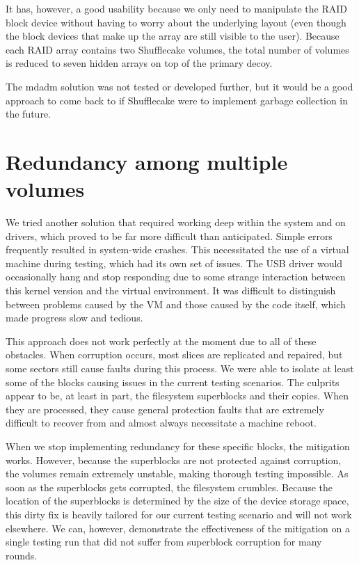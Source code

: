 \documentclass[a4paper,11pt,oneside]{report}
\begin{document}
It has, however, a good usability because we only need to manipulate the RAID block device without having to worry about the underlying layout (even though the block devices that make up the array are still visible to the user). Because each RAID array contains two Shufflecake volumes, the total number of volumes is reduced to seven hidden arrays on top of the primary decoy.

The mdadm solution was not tested or developed further, but it would be a good approach to come back to if Shufflecake were to implement garbage collection in the future.

\section{Redundancy among multiple volumes}

We tried another solution that required working deep within the system and on drivers, which proved to be far more difficult than anticipated. Simple errors frequently resulted in system-wide crashes. This necessitated the use of a virtual machine during testing, which had its own set of issues. The USB driver would occasionally hang and stop responding due to some strange interaction between this kernel version and the virtual environment. It was difficult to distinguish between problems caused by the VM and those caused by the code itself, which made progress slow and tedious.

This approach does not work perfectly at the moment due to all of these obstacles. When corruption occurs, most slices are replicated and repaired, but some sectors still cause faults during this process. We were able to isolate at least some of the blocks causing issues in the current testing scenarios. The culprits appear to be, at least in part, the filesystem superblocks and their copies. When they are processed, they cause general protection faults that are extremely difficult to recover from and almost always necessitate a machine reboot.

When we stop implementing redundancy for these specific blocks, the mitigation works. However, because the superblocks are not protected against corruption, the volumes remain extremely unstable, making thorough testing impossible. As soon as the superblocks gets corrupted, the filesystem crumbles. Because the location of the superblocks is determined by the size of the device storage space, this dirty fix is heavily tailored for our current testing scenario and will not work elsewhere. We can, however, demonstrate the effectiveness of the mitigation on a single testing run that did not suffer from superblock corruption for many rounds.
\end{document}
